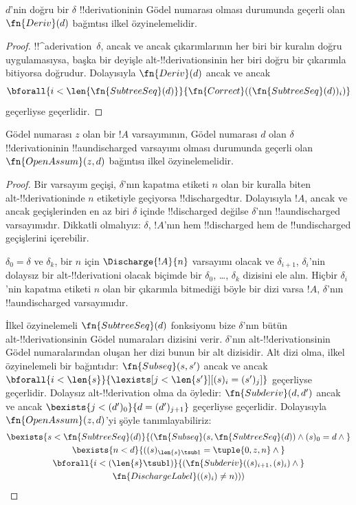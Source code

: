 \begin{prop}
  $d$'nin doğru bir $\delta$ !!{derivation}{}inin Gödel numarası olması
  durumunda geçerli olan $\fn{Deriv}(d)$ bağıntısı ilkel özyinelemelidir.
\end{prop}

\begin{proof}
  !!^a{derivation}~$\delta$, ancak ve ancak çıkarımlarının her biri bir
  kuralın doğru uygulamasıysa, başka bir deyişle alt-!!{derivation}s{}inin her
  biri doğru bir çıkarımla bitiyorsa doğrudur. Dolayısıyla $\fn{Deriv}(d)$
  ancak ve ancak
  \[
  \bforall{i<\len{\fn{SubtreeSeq}(d)}}{\fn{Correct}((\fn{SubtreeSeq}(d))_i)}
  \]
  geçerliyse geçerlidir.
\end{proof}

\begin{prop}
   Gödel numarası $z$ olan bir $!A$ varsayımının,
  Gödel numarası $d$ olan $\delta$ !!{derivation}{}inin !!a{undischarged}
  varsayımı olması durumunda geçerli olan $\fn{OpenAssum}(z, d)$ bağıntısı
  ilkel özyinelemelidir.
\end{prop}

\begin{proof}
  Bir varsayım geçişi, $\delta$'nın kapatma etiketi $n$ olan bir kuralla
  biten alt-!!{derivation}{}inde $n$ etiketiyle geçiyorsa !!{discharged}{}tır.
  Dolayısıyla $!A$, ancak ve ancak geçişlerinden en az biri $\delta$ içinde
  !!{discharged} değilse $\delta$'nın !!a{undischarged} varsayımıdır. Dikkatli
  olmalıyız: $\delta$, $!A$'nın hem !!{discharged} hem de !!{undischarged}
  geçişlerini içerebilir.

  $\delta_0 = \delta$ ve $\delta_k$, bir $n$ için
  $\Discharge{!A}{n}$ varsayımı olacak ve $\delta_{i+1}$,
  $\delta_i$'nin dolaysız bir alt-!!{derivation}{}i olacak biçimde bir
  $\delta_0$, \dots, $\delta_k$ dizisini ele alın. Hiçbir $\delta_i$'nin
  kapatma etiketi $n$ olan bir çıkarımla bitmediği böyle bir dizi varsa
  $!A$, $\delta$'nın !!a{undischarged} varsayımıdır.

  İlkel özyinelemeli $\fn{SubtreeSeq}(d)$ fonksiyonu bize $\delta$'nın bütün
  alt-!!{derivation}s{}inin Gödel numaraları dizisini verir. $\delta$'nın
  alt-!!{derivation}s{}inin Gödel numaralarından oluşan her dizi bunun bir alt
  dizisidir. Alt dizi olma, ilkel özyinelemeli bir bağıntıdır:
  $\fn{Subseq}(s, s')$ ancak ve ancak
  $\bforall{i<\len{s}}{\lexists[j<\len{s'}][(s)_i = (s')_j]}$ geçerliyse
  geçerlidir. Dolaysız alt-!!{derivation} olma da öyledir:
  $\fn{Subderiv}(d, d')$ ancak ve ancak
  $\bexists{j<(d')_0}{d = (d')_{j+1}}$ geçerliyse geçerlidir. Dolayısıyla
  $\fn{OpenAssum}(z, d)$'yi şöyle tanımlayabiliriz:
  \begin{multline*}
    \bexists{s<\fn{SubtreeSeq}(d)}{(\fn{Subseq}(s, \fn{SubtreeSeq}(d))
      \land (s)_0 = d \land {}} \\
    \bexists{n<d}{((s)_{\len{s} \tsub 1} = \tuple{0, z, n} \land {}}\\
      \bforall{i<(\len{s} \tsub 1)}{(\fn{Subderiv}((s)_{i+1}, (s)_i) \land {}}\\
      \fn{DischargeLabel}((s)_i) \neq n)))
  \end{multline*}
\end{proof}


